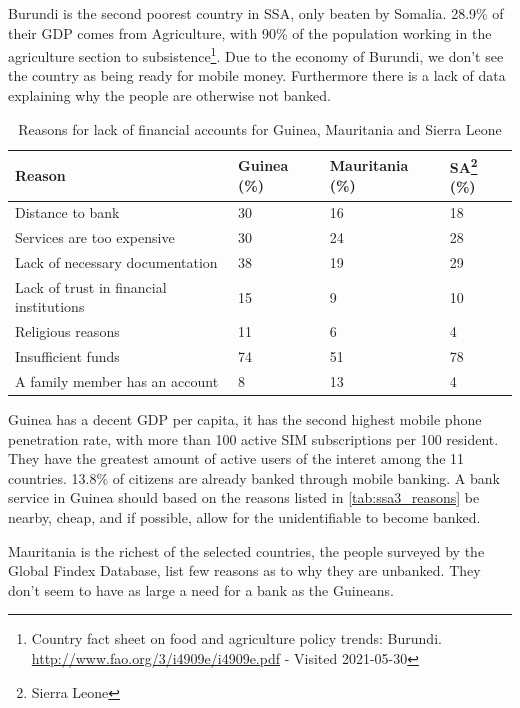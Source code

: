 \documentclass[11pt, a4paper]{article}
\begin{document}

Burundi is the second poorest country in SSA, only beaten by Somalia\cite{wbdata}. 28.9\%\cite{wbdata} of their GDP comes from Agriculture, with 90\% of the population working in the agriculture section to subsistence\footnote{Country fact sheet on food and agriculture policy trends: Burundi. \url{http://www.fao.org/3/i4909e/i4909e.pdf} - Visited 2021-05-30}. Due to the economy of Burundi, we don't see the country as being ready for mobile money. Furthermore there is a lack of data explaining why the people are otherwise not banked.

\begin{table}[!ht]
\centering
\begin{tabular}{|l|l|l|l|}
\hline
\textbf{Reason} & \textbf{Guinea (\%)} & \textbf{Mauritania (\%)} & \textbf{SA}\footnote{Sierra Leone} (\%) \\ \hline
Distance to bank & 30 & 16 & 18 \\ \hline
Services are too expensive & 30 & 24 & 28 \\ \hline
Lack of necessary documentation & 38 & 19 & 29 \\ \hline
Lack of trust in financial institutions & 15 & 9 & 10 \\ \hline
Religious reasons & 11 & 6 & 4 \\ \hline
Insufficient funds & 74 & 51 & 78 \\ \hline
A family member has an account & 8 & 13 & 4\\ \hline
\end{tabular}
\caption{Reasons for lack of financial accounts for Guinea, Mauritania and Sierra Leone\cite{gfindex}}
\label{tab:ssa3_reasons}
\end{table}


Guinea has a decent GDP per capita, it has the second highest mobile phone penetration rate, with more than 100 active SIM subscriptions per 100 resident. They have the greatest amount of active users of the interet among the 11 countries. 13.8\% of citizens are already banked through mobile banking. A bank service in Guinea should based on the reasons listed in \autoref{tab:ssa3_reasons} be nearby, cheap, and if possible, allow for the unidentifiable to become banked.

Mauritania is the richest of the selected countries, the people surveyed by the Global Findex Database\cite{gfindex}, list few reasons as to why they are unbanked. They don't seem to have as large a need for a bank as the Guineans.
\end{document}
